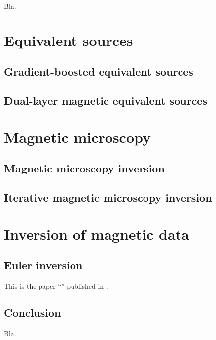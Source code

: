 \documentclass[10pt,a4paper,oneside]{book}
\begin{document}
Bla.

\part{Equivalent sources}

\chapter{Gradient-boosted equivalent sources}

\chapter{Dual-layer magnetic equivalent sources}

\part{Magnetic microscopy}

\chapter{Magnetic microscopy inversion}

\chapter{Iterative magnetic microscopy inversion}

\part{Inversion of magnetic data}

\chapter{Euler inversion}

\begingroup



This is the paper ``\Title{}'' published in \textit{\Journal}.


\endgroup

\chapter{Conclusion}

Bla.




\end{document}
